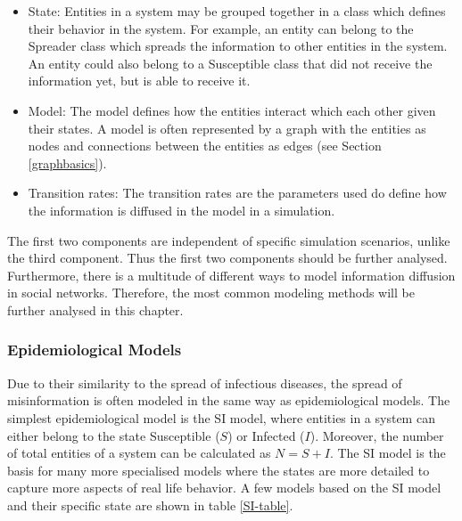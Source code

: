 \begin{itemize}
    \item State: Entities in a system may be grouped together in a class which
    defines their behavior in the system. For example, 
    an entity can belong to the  \glqq Spreader \grqq{} class which 
    spreads the information
    to other entities in the system. An entity could also belong to a
    \glqq Susceptible \grqq{} class that did not receive the information yet, 
    but is able to receive it.
    \item Model: The model defines how the entities interact which each other
    given their states. A model is often represented by a graph with the entities
    as nodes and connections between the entities as edges 
    (see Section \ref{graphbasics}).
    \item Transition rates: The transition rates are the parameters used
    do define how the information is diffused in the model in a simulation. 
\end{itemize}

The first two components are independent of specific simulation scenarios,
unlike the third component. Thus the first two components should be further
analysed. Furthermore, there is a multitude of different ways 
to model information diffusion in social networks. Therefore, the most common
modeling methods will be further analysed in this chapter.

\subsubsection{Epidemiological Models}

Due to their similarity to the spread of infectious diseases, 
the spread of misinformation is often modeled in the same way as epidemiological models.
The simplest epidemiological model is the SI model, where entities in a system
can either belong to the state \glqq Susceptible\grqq{} ($S$) or 
\glqq Infected\grqq{} ($I$). Moreover, the number of total entities of a 
system can be calculated as $N=S+I$. The SI model is the basis for many
more specialised models where the states are more detailed to capture more 
aspects of real life behavior. A few models based on the SI model and their 
specific state are shown in table \ref{SI-table}.

